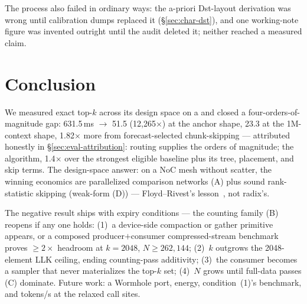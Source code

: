 The process also failed in ordinary ways: the a-priori Dst-layout
derivation was wrong until calibration dumps replaced it
(\S\ref{sec:char-dst}), and one working-note figure was invented
outright until the audit deleted it; neither reached a
measured claim.

\section{Conclusion}
\label{sec:conclusion}

We measured exact top-$k$ across its design space on a \bh \pca and
closed a four-orders-of-magnitude gap: 631.5\,ms $\to$ 51.5\us{}
(12{,}265$\times$) at the anchor shape, 23.3\us{} at the 1M-context
shape, 1.82$\times$ more from forecast-selected chunk-skipping ---
attributed honestly in
\S\ref{sec:eval-attribution}: routing supplies the orders of
magnitude; the algorithm, 1.4$\times$ over the strongest eligible
baseline plus its tree, placement, and skip terms. The design-space answer: on a NoC mesh
without scatter, the winning economics are parallelized comparison
networks (A) plus sound rank-statistic skipping (weak-form (D)) ---
Floyd--Rivest's lesson~\cite{floydrivest1975}, not
radix's.

The negative result ships with expiry conditions --- the counting
family (B) reopens if any one holds: (1)~a device-side compaction or
gather primitive appears, or a composed producer$+$consumer
compressed-stream benchmark proves $\geq 2\times$ headroom at $k{=}2048$,
$N \geq 262{,}144$; (2)~$k$ outgrows the
2048-element LLK ceiling, ending counting-pass additivity;
(3)~the consumer becomes a sampler that never materializes the top-$k$
set; (4)~$N$ grows until full-data passes (C) dominate. Future work: a Wormhole port, energy,
condition~(1)'s benchmark, and tokens/s at the relaxed call sites.
